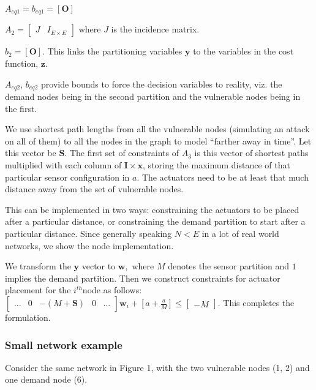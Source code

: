 \documentclass[authoryear,preprint,review,12pt]{elsarticle}
\begin{document}
$A_{eq1}=b_{eq1}=\mathbf{\left[O\right]}$

$A_{2}=\left[\begin{array}{cc}
J & I_{E\times E}\end{array}\right]$ where $J$ is the incidence matrix.

$b_{2}=\left[\mathbf{O}\right]$. This links the partitioning variables
$\mathbf{y}$ to the variables in the cost function, $\mathbf{z}$.

$A_{eq2}$, $b_{eq2}$ provide bounds to force the decision variables
to reality, viz. the demand nodes being in the second partition and
the vulnerable nodes being in the first.

We use shortest path lengths from all the vulnerable nodes (simulating
an attack on all of them) to all the nodes in the graph to model ``farther
away in time''. Let this vector be $\mathbf{S}$. The first set of
constraints of $A_{3}$ is this vector of shortest paths multiplied
with each column of $\mathbf{I\times x}$, storing the maximum distance
of that particular sensor configuration in $a$. The actuators need
to be at least that much distance away from the set of vulnerable
nodes.

This can be implemented in two ways: constraining the actuators to
be placed after a particular distance, or constraining the demand
partition to start after a particular distance. Since generally speaking
$N<E$ in a lot of real world networks, we show the node implementation.

We transform the $\mathbf{y}$ vector to $\mathbf{w},$ where $M$
denotes the sensor partition and $1$ implies the demand partition.
Then we construct constraints for actuator placement for the $i^{th}$node
as follows: $\left[\begin{array}{ccccc}
... & 0 & -(M+\mathbf{S}) & 0 & ...\end{array}\right]\mathbf{w}_{i}+\left[a+\frac{a}{M}\right]\leq\left[\begin{array}{c}
-M\end{array}\right]$. This completes the formulation.


\subsubsection{Small network example}

Consider the same network in Figure 1, with the two vulnerable nodes
(1, 2) and one demand node (6).
\end{document}
